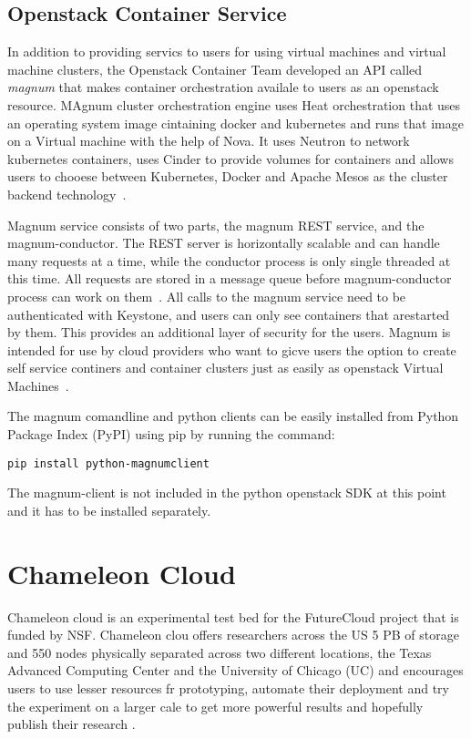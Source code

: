 \subsection{Openstack Container Service}
In addition to providing servics to users for using virtual machines
and virtual machine clusters, the Openstack Container Team developed
an API called \emph{magnum} that makes container orchestration
availale to users as an openstack resource. MAgnum cluster
orchestration engine uses Heat orchestration that uses an operating
system image cintaining docker and kubernetes and runs that image on a
Virtual machine with the help of Nova. It uses Neutron to network
kubernetes containers, uses Cinder to provide volumes for containers
and allows users to chooese between Kubernetes, Docker and Apache
Mesos as the cluster backend
technology~\cite{hid-sp18-503-magnum-wiki}.

Magnum service consists of two parts, the magnum REST service, and the
magnum-conductor. The REST server is horizontally scalable and can
handle many requests at a time, while the conductor process is only
single threaded at this time. All requests are stored in a message
queue before magnum-conductor process can work on
them~\cite{hid-sp18-503-magnum-intro}.  All calls to the magnum
service need to be authenticated with Keystone, and users can only see
containers that arestarted by them. This provides an additional layer
of security for the users. Magnum is intended for use by cloud
providers who want to gicve users the option to create self service
continers and container clusters just as easily as openstack Virtual
Machines~\cite{hid-sp18-503-magnum-wiki}.

The magnum comandline and python clients can be easily installed from
Python Package Index (PyPI) using pip by running the command:
\begin{verbatim}
pip install python-magnumclient
\end{verbatim}
The magnum-client is not included in the python openstack SDK at this
point and it has to be installed separately.

\section{Chameleon Cloud}
Chameleon cloud is an experimental test bed for the FutureCloud
project that is funded by NSF. Chameleon clou offers researchers
across the US 5 PB of storage and 550 nodes physically separated
across two different locations, the Texas Advanced Computing Center
and the University of Chicago (UC) and encourages users to use lesser
resources fr prototyping, automate their deployment and try the
experiment on a larger cale to get more powerful results and hopefully
publish their research
\cite{hid-sp18-503-handbook}.

